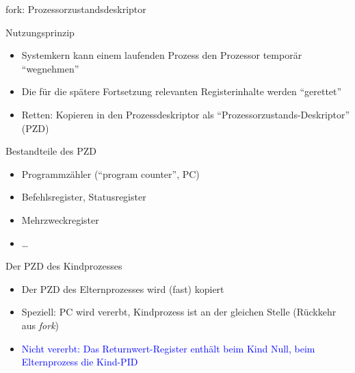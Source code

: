 \documentclass[utf8,9pt]{beamer}
\newcommand{\blau}[1]{\textcolor{blue}{#1}}
\begin{document}
\begin{frame}{fork: Prozessorzustandsdeskriptor}{}

  \begin{block}{\small Nutzungsprinzip}
    \footnotesize
    \begin{itemize}
    \item Systemkern kann einem laufenden Prozess den Prozessor temporär
      "`wegnehmen"'
    \item Die für die spätere Fortsetzung relevanten Registerinhalte werden "`gerettet"' 
    \item Retten: Kopieren in den Prozessdeskriptor als
         "`Prozessorzustands-Deskriptor"' (PZD)
    \end{itemize}
  \end{block}

  \begin{block}{\small Bestandteile des PZD}
   \footnotesize
    \begin{itemize}
    \item Programmzähler ("`program counter"', PC)
    \item Befehlsregister, Statusregister
    \item Mehrzweckregister
    \item \dots
    \end{itemize}
  \end{block}

  \begin{block}{\small Der PZD des Kindprozesses}
    \footnotesize
    \begin{itemize}
    \item Der PZD des Elternprozesses wird (fast) kopiert
    \item Speziell: PC wird vererbt, Kindprozess ist an der gleichen
      Stelle (Rückkehr aus {\em fork\/})
    \item \blau{Nicht vererbt: Das Returnwert-Register enthält beim Kind Null,
        beim Elternprozess die Kind-PID}
    \end{itemize}

  \end{block}

\end{frame}
\end{document}
